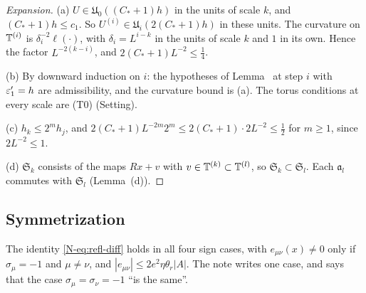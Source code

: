 \begin{proof}[Expansion]
(a) $U\in\mathfrak U_0((C_*+1)h)$ in the units of scale $k$, and $(C_*+1)h\le c_1$. So $U^{(i)}\in\mathfrak U_i(2(C_*+1)h)$ in these units. The curvature on $\mathbb T^{(i)}$ is $\delta_i^{-2}\ell(\cdot)$, with $\delta_i=L^{i-k}$ in the units of scale $k$ and $1$ in its own. Hence the factor $L^{-2(k-i)}$, and $2(C_*+1)L^{-2}\le\frac14$.

(b) By downward induction on $i$: the hypotheses of Lemma~ at step $i$ with $\varepsilon'_1=h$ are admissibility, and the curvature bound is (a). The torus conditions at every scale are (T0) (Setting).

(c) $h_k\le2^mh_j$, and $2(C_*+1)L^{-2m}2^m\le2(C_*+1)\cdot2L^{-2}\le\frac12$ for $m\ge1$, since $2L^{-2}\le1$.

(d) $\mathfrak S_k$ consists of the maps $Rx+v$ with $v\in\mathbb T^{(k)}\subset\mathbb T^{(l)}$, so $\mathfrak S_k\subset\mathfrak S_l$. Each $\mathfrak a_l$ commutes with $\mathfrak S_l$ (Lemma~(d)).
\end{proof}
\status{Expanded. Remark~\Nref{rem:later-symmetry} states the needed hypothesis $g_i\in(0,\gamma]$.}

\subsection{Symmetrization}\label{xb:sym}

\begin{detail}\label{xb:d-refl}
The identity \eqref{N-eq:refl-diff} holds in all four sign cases, with $e_{\mu\nu}(x)\ne0$ only if $\sigma_\mu=-1$ and $\mu\ne\nu$, and $|e_{\mu\nu}|\le2e^2\eta\theta_r|A|$. The note writes one case, and says that the case $\sigma_\mu=\sigma_\nu=-1$ ``is the same''.
\end{detail}

